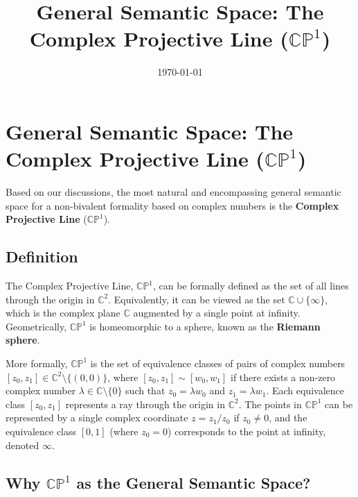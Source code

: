 \documentclass{article}
\title{General Semantic Space: The Complex Projective Line ($\mathbb{CP}^1$)}
\author{}
\date{\today}
\begin{document}
	
	\maketitle
	
	\section{General Semantic Space: The Complex Projective Line ($\mathbb{CP}^1$)}
	
	Based on our discussions, the most natural and encompassing general semantic space for a non-bivalent formality based on complex numbers is the \textbf{Complex Projective Line} ($\mathbb{CP}^1$).
	
	\subsection{Definition}
	
	The Complex Projective Line, $\mathbb{CP}^1$, can be formally defined as the set of all lines through the origin in $\mathbb{C}^2$. Equivalently, it can be viewed as the set $\mathbb{C} \cup \{\infty\}$, which is the complex plane $\mathbb{C}$ augmented by a single point at infinity. Geometrically, $\mathbb{CP}^1$ is homeomorphic to a sphere, known as the \textbf{Riemann sphere}.
	
	More formally, $\mathbb{CP}^1$ is the set of equivalence classes of pairs of complex numbers $[z_0, z_1] \in \mathbb{C}^2 \setminus \{(0,0)\}$, where $[z_0, z_1] \sim [w_0, w_1]$ if there exists a non-zero complex number $\lambda \in \mathbb{C} \setminus \{0\}$ such that $z_0 = \lambda w_0$ and $z_1 = \lambda w_1$. Each equivalence class $[z_0, z_1]$ represents a ray through the origin in $\mathbb{C}^2$. The points in $\mathbb{CP}^1$ can be represented by a single complex coordinate $z = z_1/z_0$ if $z_0 \neq 0$, and the equivalence class $[0, 1]$ (where $z_0 = 0$) corresponds to the point at infinity, denoted $\infty$.
	
	\subsection{Why $\mathbb{CP}^1$ as the General Semantic Space?}
	
\end{document}
